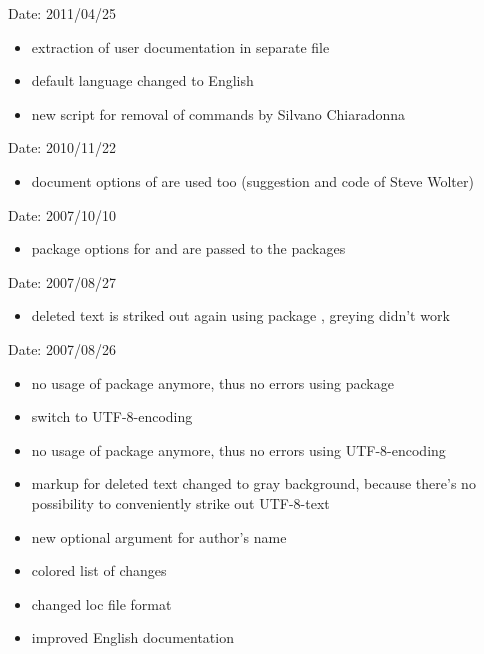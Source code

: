 
Date: 2011/04/25
\begin{itemize}
	\item extraction of user documentation in separate file
	\item default language changed to English
	\item new script for removal of  commands by Silvano Chiaradonna
\end{itemize}


Date: 2010/11/22
\begin{itemize}
	\item document options of  are used too (suggestion and code of Steve Wolter)
\end{itemize}


Date: 2007/10/10
\begin{itemize}
	\item package options for  and  are passed to the packages
\end{itemize}


Date: 2007/08/27
\begin{itemize}
	\item deleted text is striked out again using package , greying didn't work
\end{itemize}


Date: 2007/08/26
\begin{itemize}
	\item no usage of package  anymore, thus no errors using package 
	\item switch to UTF-8-encoding
	\item no usage of package  anymore, thus no errors using UTF-8-encoding
	\item markup for deleted text changed to gray background, because there's no possibility to conveniently strike out UTF-8-text
	\item new optional argument for author's name
	\item colored list of changes
	\item changed loc file format
	\item improved English documentation
\end{itemize}


